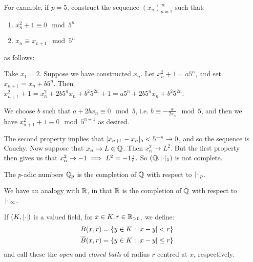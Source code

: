 \documentclass[10pt,a4paper]{article}
\begin{document}
For example, if $p=5$, construct the sequence $(x_n)_{n=1}^\infty$ such that:
\begin{enumerate}
  \item $x_n^2+ 1\equiv 0 \mod 5^n$
  \item $x_n \equiv x_{n+1} \mod 5^n$
\end{enumerate}
as follows:

Take $x_1 = 2$. Suppose we have constructed $x_n$. Let $x_n^2 + 1 = a5^n$, and set $x_{n+1} = x_n + b5^n$. Then $x_{n+1}^2 + 1=  x_n^2 + 2b5^nx_n + b^2 5^{2n} + 1 = a5^n + 2b5^nx_n + b^2 5^{2n}$.

We choose $b$ such that $a+2bx_n \equiv 0 \mod 5$, i.e. $b \equiv -\frac{a}{2x_n} \mod 5$, and then we have $x_{n+1}^2 +1 \equiv 0 \mod 5^{n+1}$ as desired.

The second property implies that $\lvert x_{n+1} - x_n\rvert_5 < 5^{-n} \to 0$, and so the sequence is Cauchy. Now suppose that $x_n \to L \in \mathbb{Q}$. Then $x_n^2 \to L^2$. But the first property then gives us that $x_n^2 \to -1 \implies L^2 = -1 \lightning.$ So $(\mathbb{Q}, \lvert\cdot\rvert_5)$ is not complete.

\begin{definition}
  The $p$-adic numbers $\mathbb{Q}_p$ is the completion of $\mathbb{Q}$ with respect to $\lvert\cdot\rvert_p$.
\end{definition}
We have an analogy with $\mathbb{R}$, in that $\mathbb{R}$ is the completion of $\mathbb{Q}$ with respect to $\lvert\cdot\rvert_\infty$.

If $(K, \lvert\cdot\rvert)$ is a valued field, for $x \in K, r \in \mathbb{R}_{>0}$, we define:
\begin{align*}
  B(x, r) &= \{y \in K : \lvert x-y\rvert < r \}\\
  \overline{B}(x, r) &= \{y \in K : \lvert x-y\rvert \leq r\}
\end{align*}
and call these the \emph{open} and \emph{closed balls} of radius $r$ centred at $x$, respectively.
\end{document}
